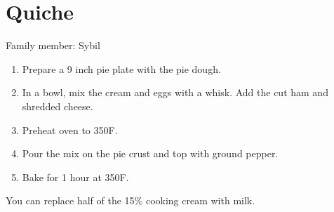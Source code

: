 \chapter{Quiche}
\label{ch:hamquiche}


Family member: Sybil

\begin{enumerate}
    \item Prepare a 9 inch pie plate with the pie dough.
    \item In a bowl, mix the cream and eggs with a whisk. Add the cut ham and shredded cheese.
    \item Preheat oven to 350\degree F.
    \item Pour the mix on the pie crust and top with ground pepper.
    \item Bake for 1 hour at 350\degree F.
\end{enumerate}

You can replace half of the 15\% cooking cream with milk.

